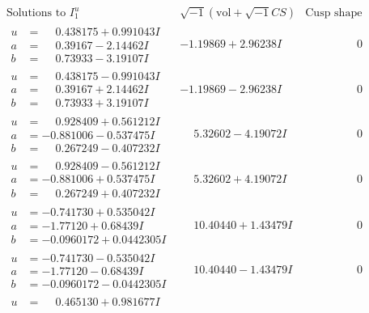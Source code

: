 \documentclass[1p]{elsarticle_modified}
\theoremstyle{definition}
\newcommand{\I}{\sqrt{-1}}
\begin{document}
$$\begin{array}{c|c|c}
\text{Solutions to }I^u_{1}& \I (\text{vol} + \sqrt{-1}CS) & \text{Cusp shape}\\
 \hline 
\begin{aligned}
u &= \phantom{-}0.438175 + 0.991043 I \\
a &= \phantom{-}0.39167 - 2.14462 I \\
b &= \phantom{-}0.73933 - 3.19107 I\end{aligned}
 & -1.19869 + 2.96238 I & \phantom{-0.000000 } 0 \\ \hline\begin{aligned}
u &= \phantom{-}0.438175 - 0.991043 I \\
a &= \phantom{-}0.39167 + 2.14462 I \\
b &= \phantom{-}0.73933 + 3.19107 I\end{aligned}
 & -1.19869 - 2.96238 I & \phantom{-0.000000 } 0 \\ \hline\begin{aligned}
u &= \phantom{-}0.928409 + 0.561212 I \\
a &= -0.881006 - 0.537475 I \\
b &= \phantom{-}0.267249 - 0.407232 I\end{aligned}
 & \phantom{-}5.32602 - 4.19072 I & \phantom{-0.000000 } 0 \\ \hline\begin{aligned}
u &= \phantom{-}0.928409 - 0.561212 I \\
a &= -0.881006 + 0.537475 I \\
b &= \phantom{-}0.267249 + 0.407232 I\end{aligned}
 & \phantom{-}5.32602 + 4.19072 I & \phantom{-0.000000 } 0 \\ \hline\begin{aligned}
u &= -0.741730 + 0.535042 I \\
a &= -1.77120 + 0.68439 I \\
b &= -0.0960172 + 0.0442305 I\end{aligned}
 & \phantom{-}10.40440 + 1.43479 I & \phantom{-0.000000 } 0 \\ \hline\begin{aligned}
u &= -0.741730 - 0.535042 I \\
a &= -1.77120 - 0.68439 I \\
b &= -0.0960172 - 0.0442305 I\end{aligned}
 & \phantom{-}10.40440 - 1.43479 I & \phantom{-0.000000 } 0 \\ \hline\begin{aligned}
u &= \phantom{-}0.465130 + 0.981677 I \\

\end{aligned}
\end{array}$$
\end{document}
